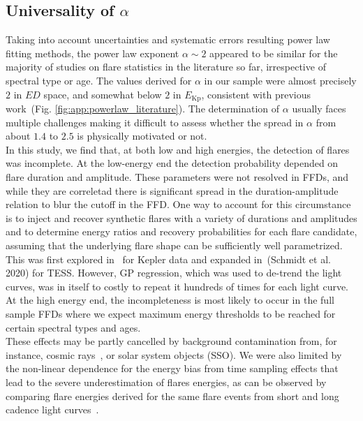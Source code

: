 \documentclass{aa}
\begin{document}
\subsection{Universality of $\alpha$}
Taking into account uncertainties and systematic errors resulting power law fitting methods, the power law exponent $\alpha\sim 2$ appeared to be similar for the majority of studies on flare statistics in the literature so far, irrespective of spectral type or age. The values derived for $\alpha$ in our sample were almost precisely $2$ in $ED$ space, and somewhat below $2$ in $E_\mathrm{Kp}$, consistent with previous work~(Fig. \ref{fig:app:powerlaw_literature}). The determination of $\alpha$ usually faces multiple challenges making it difficult to assess whether the spread in $\alpha$ from about $1.4$ to $2.5$ is physically motivated or not. 
\\
In this study, we find that, at both low and high energies, the detection of flares was incomplete. At the low-energy end the detection probability depended on flare duration and amplitude. These parameters were not resolved in FFDs, and while they are correletad there is significant spread in the duration-amplitude relation to blur the cutoff in the FFD. One way to account for this circumstance is to inject and recover synthetic flares with a variety of durations and amplitudes and to determine energy ratios and recovery probabilities for each flare candidate, assuming that the underlying flare shape can be sufficiently well parametrized. This was first explored in~\citet{davenport_kepler_2014} for Kepler data and expanded in~(Schmidt et al. 2020) for TESS. However, GP regression, which was used to de-trend the light curves, was in itself to costly to repeat it hundreds of times for each light curve. 
\\
At the high energy end, the incompleteness is most likely to occur in the full sample FFDs where we expect maximum energy thresholds to be reached for certain spectral types and ages. 
\\
These effects may be partly cancelled by background contamination from, for instance, cosmic rays~\citep{aschwanden_powerlaws_2015}, or solar system objects (SSO). We were also limited by the non-linear dependence for the energy bias from time sampling effects that lead to the severe underestimation of flares energies, as can be observed by comparing flare energies derived for the same flare events from short and long cadence light curves~\citep{yang_flaresampling_2018}. 
\end{document}
